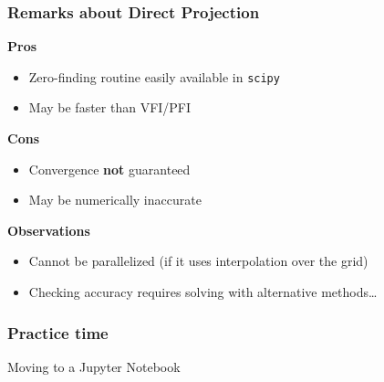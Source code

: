 \documentclass[10pt, aspectratio=1610, handout]{beamer}
\begin{document}
  \begin{frame}
    \frametitle{Remarks about Direct Projection}

    \textbf{Pros}
    \begin{itemize}
      \item Zero-finding routine easily available in \texttt{scipy}
      \item May be faster than VFI/PFI
    \end{itemize}

    \vfill\pause

    \textbf{Cons}
    \begin{itemize}
      \item Convergence \textbf{not} guaranteed
      \item May be numerically inaccurate
    \end{itemize}

    \vfill\pause

    \textbf{Observations}
    \begin{itemize}
      \item Cannot be parallelized (if it uses interpolation over the grid)
      \item Checking accuracy requires solving with alternative methods\dots
    \end{itemize}

  \end{frame}

  \begin{frame}
    \frametitle{Practice time}

    Moving to a Jupyter Notebook

  \end{frame}
\end{document}
